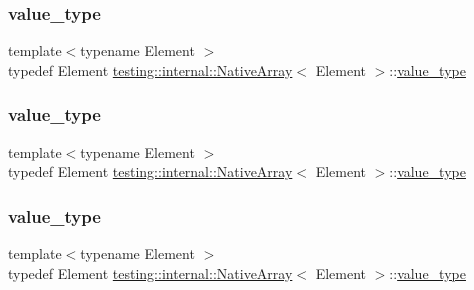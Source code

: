\subsubsection{\texorpdfstring{value\_type}{value\_type}\hspace{0.1cm}{\footnotesize\ttfamily [1/3]}}
{\footnotesize\ttfamily template$<$typename Element $>$ \\
typedef Element \mbox{\hyperlink{classtesting_1_1internal_1_1_native_array}{testing\+::internal\+::\+Native\+Array}}$<$ Element $>$\+::\mbox{\hyperlink{classtesting_1_1internal_1_1_native_array_a12216d686e16e4cc63d952fada5b2ba9}{value\+\_\+type}}}

\mbox{\label{classtesting_1_1internal_1_1_native_array_a12216d686e16e4cc63d952fada5b2ba9}} 
\subsubsection{\texorpdfstring{value\_type}{value\_type}\hspace{0.1cm}{\footnotesize\ttfamily [2/3]}}
{\footnotesize\ttfamily template$<$typename Element $>$ \\
typedef Element \mbox{\hyperlink{classtesting_1_1internal_1_1_native_array}{testing\+::internal\+::\+Native\+Array}}$<$ Element $>$\+::\mbox{\hyperlink{classtesting_1_1internal_1_1_native_array_a12216d686e16e4cc63d952fada5b2ba9}{value\+\_\+type}}}

\mbox{\label{classtesting_1_1internal_1_1_native_array_a12216d686e16e4cc63d952fada5b2ba9}} 
\subsubsection{\texorpdfstring{value\_type}{value\_type}\hspace{0.1cm}{\footnotesize\ttfamily [3/3]}}
{\footnotesize\ttfamily template$<$typename Element $>$ \\
typedef Element \mbox{\hyperlink{classtesting_1_1internal_1_1_native_array}{testing\+::internal\+::\+Native\+Array}}$<$ Element $>$\+::\mbox{\hyperlink{classtesting_1_1internal_1_1_native_array_a12216d686e16e4cc63d952fada5b2ba9}{value\+\_\+type}}}



